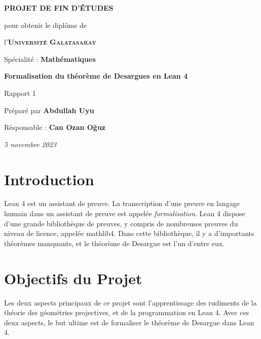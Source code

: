 \documentclass[12pt, oneside]{memoir}
\theoremstyle{definition}
\begin{document}
\thispagestyle{empty}
\begin{center}
  \vspace*{\fill}
  

  \vspace{1cm}
  \large{\textbf{PROJET DE FIN D'ÉTUDES}}

  \vspace{0.5cm}
  {\small pour obtenir le diplôme de}

  \vspace{0.5cm}
  l'\textsc{\textbf{Université Galatasaray}}

  {\small Spécialité : \textbf{Mathématiques}}

  \vspace{2.25cm}
  {\Large\textbf{Formalisation du théorème de Desargues en Lean 4}}

  Rapport 1

  \vspace{1.25cm}
  Préparé par \textbf{Abdullah Uyu}

  Résponsable : \textbf{Can Ozan Oğuz}

  \vspace{2.25cm}
  \textit{5 novembre 2023}
  \vspace*{\fill}
\end{center}
\clearpage
{}
\section*{Introduction}
Lean 4 est un assistant de preuve. La transcription d'une preuve en
langage humain dans un assistant de preuve est appelée
\textit{formalisation}. Lean 4 dispose d'une grande bibliothèque de
preuves, y compris de nombreuses preuves du niveau de licence, appelée
mathlib4. Dans cette bibliothèque, il y a d'importants théorèmes
manquants, et le théorème de Desargue est l'un d'entre eux.
\section*{Objectifs du Projet}
Les deux aspects principaux de ce projet sont l'apprentissage des
rudiments de la théorie des géométries projectives, et de la
programmation en Lean 4. Avec ces deux aspects, le but ultime est de
formaliser le théorème de Desargue dans Lean 4.
\end{document}

